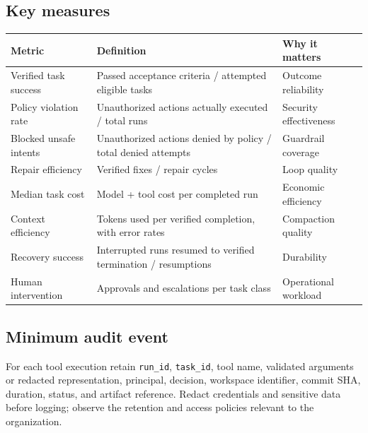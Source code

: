 \documentclass[10pt,letterpaper]{article}
\newcommand{\code}[1]{\texttt{#1}}
\begin{document}
\subsection{Key measures}
\begin{tabularx}{\textwidth}{L{3.5cm} Y L{3.25cm}}
\toprule
\textbf{Metric} & \textbf{Definition} & \textbf{Why it matters} \\
\midrule
Verified task success & Passed acceptance criteria / attempted eligible tasks & Outcome reliability \\
Policy violation rate & Unauthorized actions actually executed / total runs & Security effectiveness \\
Blocked unsafe intents & Unauthorized actions denied by policy / total denied attempts & Guardrail coverage \\
Repair efficiency & Verified fixes / repair cycles & Loop quality \\
Median task cost & Model + tool cost per completed run & Economic efficiency \\
Context efficiency & Tokens used per verified completion, with error rates & Compaction quality \\
Recovery success & Interrupted runs resumed to verified termination / resumptions & Durability \\
Human intervention & Approvals and escalations per task class & Operational workload \\
\bottomrule
\end{tabularx}

\subsection{Minimum audit event}
For each tool execution retain \code{run\_id}, \code{task\_id}, tool name, validated arguments or redacted representation, principal, decision, workspace identifier, commit SHA, duration, status, and artifact reference. Redact credentials and sensitive data before logging; observe the retention and access policies relevant to the organization.
\end{document}
